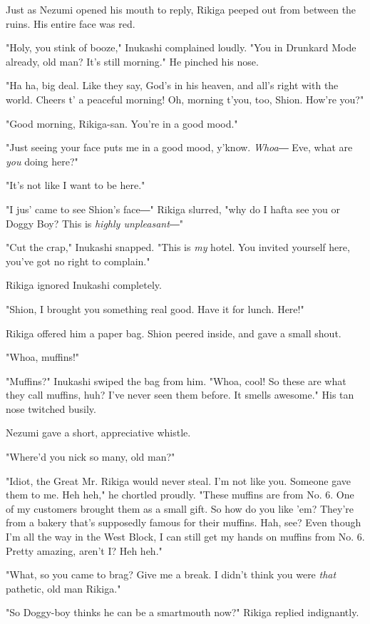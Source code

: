 Just as Nezumi opened his mouth to reply, Rikiga peeped out from between
the ruins. His entire face was red.

"Holy, you stink of booze," Inukashi complained loudly. "You in Drunkard
Mode already, old man? It's still morning." He pinched his nose.

"Ha ha, big deal. Like they say, God's in his heaven, and all's right
with the world. Cheers t' a peaceful morning! Oh, morning t'you, too,
Shion. How're you?"

"Good morning, Rikiga-san. You're in a good mood."

"Just seeing your face puts me in a good mood, y'know. \emph{Whoa}― Eve, what
are \emph{you} doing here?"

"It's not like I want to be here."

"I jus' came to see Shion's face―" Rikiga slurred, "why do I hafta see
you or Doggy Boy? This is \emph{highly unpleasant}―"

"Cut the crap," Inukashi snapped. "This is \emph{my} hotel. You invited
yourself here, you've got no right to complain."

Rikiga ignored Inukashi completely.

"Shion, I brought you something real good. Have it for lunch. Here!"

Rikiga offered him a paper bag. Shion peered inside, and gave a small
shout.

"Whoa, muffins!"

"Muffins?" Inukashi swiped the bag from him. "Whoa, cool! So these are
what they call muffins, huh? I've never seen them before. It smells
awesome." His tan nose twitched busily.

Nezumi gave a short, appreciative whistle.

"Where'd you nick so many, old man?"

"Idiot, the Great Mr. Rikiga would never steal. I'm not like you.
Someone gave them to me. Heh heh," he chortled proudly. "These muffins
are from No. 6. One of my customers brought them as a small gift. So how
do you like 'em? They're from a bakery that's supposedly famous for
their muffins. Hah, see? Even though I'm all the way in the West Block,
I can still get my hands on muffins from No. 6. Pretty amazing, aren't
I? Heh heh."

"What, so you came to brag? Give me a break. I didn't think you were
\emph{that} pathetic, old man Rikiga."

"So Doggy-boy thinks he can be a smartmouth now?" Rikiga replied
indignantly.

